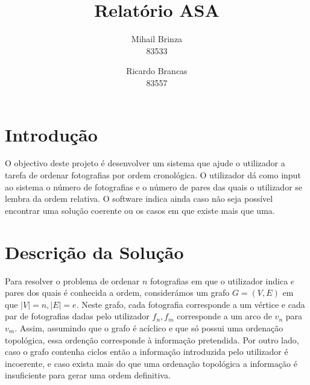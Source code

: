 \documentclass[a4paper]{article}
\title{\LARGE \textbf{Relatório ASA}}
\author{Mihail Brinza \\ \scriptsize 83533 \normalsize \and Ricardo Brancas \\ \scriptsize 83557 \normalsize}
\begin{document}
  \maketitle

  \section{Introdução}
  O objectivo deste projeto é desenvolver um sistema que ajude o utilizador a tarefa de ordenar
  fotografias por ordem cronológica.
  O utilizador dá como input ao sistema o número de fotografias e o número de pares das quais o
  utilizador se lembra da ordem relativa.
  O software indica ainda caso não seja possível encontrar uma solução coerente ou os casos em que existe
  mais que uma.

  \section{Descrição da Solução}

  Para resolver o problema de ordenar \(n\) fotografias em que o utilizador indica \(e\) pares dos
  quais é conhecida a ordem, considerámos um grafo \(G = (V, E)\) em que \(|V| = n,  |E| = e\).
  Neste grafo, cada fotografia corresponde a um vértice e cada par de fotografias dadas pelo utilizador
  \(f_n,  f_m\) corresponde a um arco de \(v_n\) para \(v_m\).
  Assim, assumindo que o grafo é acíclico e que só possui uma ordenação topológica, essa
  ordenção corresponde à informação pretendida. Por outro lado, caso o grafo contenha ciclos
  então a informação introduzida pelo utilizador é incoerente, e caso exista mais do que uma
  ordenação topológica a informação é insuficiente para gerar uma ordem definitiva.
\end{document}
